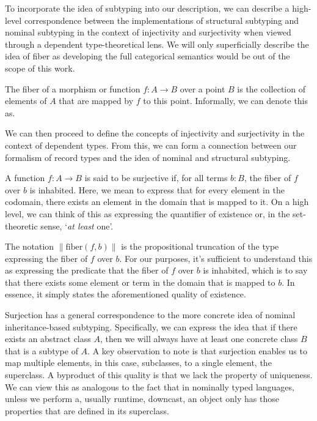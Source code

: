 To incorporate the idea of subtyping into our description, we can describe a high-level correspondence between the implementations of structural subtyping and nominal subtyping in the context of injectivity and surjectivity when viewed through a dependent type-theoretical lens. We will only superficially describe the idea of fiber as developing the full categorical semantics would be out of the scope of this work.

\begin{definition}
 The fiber of a morphism or function $f : A \rightarrow B$ over a point $B$ is the collection of elements of $A$ that are mapped by $f$ to this point. Informally, we can denote this as.
  
\end{definition}

We can then proceed to define the concepts of injectivity and surjectivity in the context of dependent types. From this, we can form a connection between our formalism of record types and the idea of nominal and structural subtyping.

\begin{definition}
 A function $f : A \rightarrow B$ is said to be surjective if, for all terms $b : B$, the fiber of $f$ over $b$ is inhabited. Here, we mean to express that for every element in the codomain, there exists an element in the domain that is mapped to it. On a high level, we can think of this as expressing the quantifier of existence or, in the set-theoretic sense, `\textit{at least} one'.
  
  
  
 The notation $\parallel \text{fiber}(f, b) \parallel$ is the propositional truncation of the type expressing the fiber of $f$ over $b$. For our purposes, it's sufficient to understand this as expressing the predicate that the fiber of $f$ over $b$ is inhabited, which is to say that there exists some element or term in the domain that is mapped to $b$. In essence, it simply states the aforementioned quality of existence.
\end{definition}

Surjection has a general correspondence to the more concrete idea of nominal inheritance-based subtyping. Specifically, we can express the idea that if there exists an abstract class $A$, then we will always have at least one concrete class $ B$ that is a subtype of $A$. A key observation to note is that surjection enables us to map multiple elements, in this case, subclasses, to a single element, the superclass. A byproduct of this quality is that we lack the property of uniqueness. We can view this as analogous to the fact that in nominally typed languages, unless we perform a, usually runtime, downcast, an object only has those properties that are defined in its superclass.

